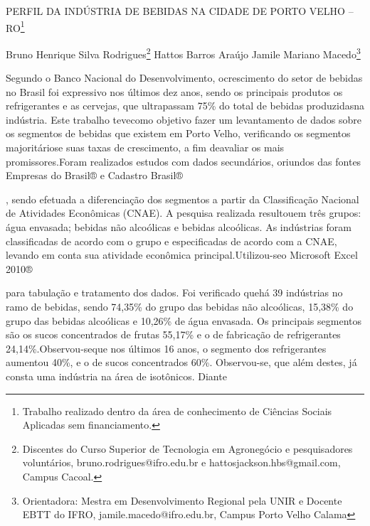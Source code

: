 \documentclass[article,12pt,onesidea,4paper,english,brazil]{abntex2}
\begin{document}
	
	
	\frenchspacing 
	
	\begin{center}
		\LARGE PERFIL DA INDÚSTRIA DE BEBIDAS NA CIDADE DE PORTO VELHO – RO\footnote{Trabalho realizado dentro da área de conhecimento de Ciências Sociais Aplicadas sem
			financiamento.}
		
		\normalsize
		Bruno Henrique Silva Rodrigues\footnote{Discentes do Curso Superior de Tecnologia em Agronegócio e pesquisadores voluntários,
			bruno.rodrigues@ifro.edu.br e hattosjackson.hbs@gmail.com, Campus Cacoal.} 
		Hattos Barros Araújo
		Jamile Mariano Macedo\footnote{Orientadora: Mestra em Desenvolvimento Regional pela UNIR e Docente EBTT do IFRO,
			jamile.macedo@ifro.edu.br, Campus Porto Velho Calama} 
		
	\end{center}
	
	\noindent Segundo o Banco Nacional do Desenvolvimento, ocrescimento do setor de bebidas
	no Brasil foi expressivo nos últimos dez anos, sendo os principais produtos os
	refrigerantes e as cervejas, que ultrapassam 75\% do total de bebidas produzidasna
	indústria. Este trabalho tevecomo objetivo fazer um levantamento de dados sobre os
	segmentos de bebidas que existem em Porto Velho, verificando os segmentos
	majoritáriose suas taxas de crescimento, a fim deavaliar os mais promissores.Foram
	realizados estudos com dados secundários, oriundos das fontes Empresas do
	Brasil®
	e Cadastro Brasil®
	
	, sendo efetuada a diferenciação dos segmentos a partir da
	Classificação Nacional de Atividades Econômicas (CNAE). A pesquisa realizada
	resultouem três grupos: água envasada; bebidas não alcoólicas e bebidas
	alcoólicas. As indústrias foram classificadas de acordo com o grupo e especificadas
	de acordo com a CNAE, levando em conta sua atividade econômica
	principal.Utilizou-seo Microsoft Excel 2010®
	
	para tabulação e tratamento dos dados.
	Foi verificado quehá 39 indústrias no ramo de bebidas, sendo 74,35\% do grupo das
	bebidas não alcoólicas, 15,38\% do grupo das bebidas alcoólicas e 10,26\% de água
	envasada. Os principais segmentos são os sucos concentrados de frutas 55,17\% e o
	de fabricação de refrigerantes 24,14\%.Observou-seque nos últimos 16 anos, o
	segmento dos refrigerantes aumentou 40\%, e o de sucos concentrados 60\%.
	Observou-se, que além destes, já consta uma indústria na área de isotônicos. Diante
	
\end{document}
